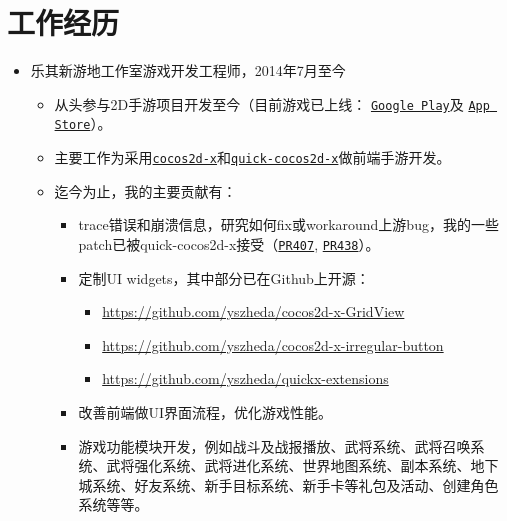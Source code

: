 \documentclass[letterpaper]{article}
\begin{document}

\section*{工作经历}
\begin{itemize}
  \item 乐其新游地工作室游戏开发工程师，2014年7月至今
	\begin{itemize}
      \item 从头参与2D手游项目开发至今（目前游戏已上线：
		  \href{https://play.google.com/store/apps/details?id=com.game168.yysg}{\tt Google Play}及
          \href{https://itunes.apple.com/us/app/ye-ye-san-guo/id976517523?mt=8}{\tt App Store}）。
      \item 主要工作为采用\href{http://cocos2d-x.org/}{\tt cocos2d-x}和\href{https://github.com/dualface/v3quick}{\tt quick-cocos2d-x}做前端手游开发。
      \item 迄今为止，我的主要贡献有：
          \begin{itemize}
              \item trace错误和崩溃信息，研究如何fix或workaround上游bug，我的一些patch已被quick-cocos2d-x接受（\href{https://github.com/dualface/v3quick/pull/407}{\tt PR407}, \href{https://github.com/dualface/v3quick/pull/438}{\tt PR438}）。
			  \item 定制UI widgets，其中部分已在Github上开源：
					  \begin{itemize}
							  \item \url{https://github.com/yszheda/cocos2d-x-GridView}
							  \item \url{https://github.com/yszheda/cocos2d-x-irregular-button}
							  \item \url{https://github.com/yszheda/quickx-extensions}
					  \end{itemize}
			  \item 改善前端做UI界面流程，优化游戏性能。
			  \item 游戏功能模块开发，例如战斗及战报播放、武将系统、武将召唤系统、武将强化系统、武将进化系统、世界地图系统、副本系统、地下城系统、好友系统、新手目标系统、新手卡等礼包及活动、创建角色系统等等。
	  \end{itemize}
	  \end{itemize}
\end{itemize}
\end{document}

